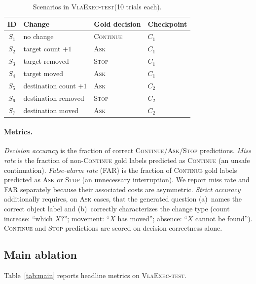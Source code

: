 \documentclass{article}
\newcommand{\datasettest}{\textsc{VlaExec-test}}
\begin{document}
\begin{table}[h]
\centering
\small
\caption{Scenarios in \datasettest (10 trials each).}
\label{tab:scenarios}
\begin{tabular}{clll}
\toprule
ID & Change & Gold decision & Checkpoint \\
\midrule
$S_1$ & no change                  & \textsc{Continue} & $C_1$ \\
$S_2$ & target count $+1$          & \textsc{Ask}      & $C_1$ \\
$S_3$ & target removed             & \textsc{Stop}     & $C_1$ \\
$S_4$ & target moved               & \textsc{Ask}      & $C_1$ \\
$S_5$ & destination count $+1$     & \textsc{Ask}      & $C_2$ \\
$S_6$ & destination removed        & \textsc{Stop}     & $C_2$ \\
$S_7$ & destination moved          & \textsc{Ask}      & $C_2$ \\
\bottomrule
\end{tabular}
\end{table}

\paragraph{Metrics.}
\emph{Decision accuracy} is the fraction of correct
\textsc{Continue}/\textsc{Ask}/\textsc{Stop} predictions. \emph{Miss
rate} is the fraction of non-\textsc{Continue} gold labels predicted as
\textsc{Continue} (an unsafe continuation). \emph{False-alarm rate}
(FAR) is the fraction of \textsc{Continue} gold labels predicted as
\textsc{Ask} or \textsc{Stop} (an unnecessary interruption). We report
miss rate and FAR separately because their associated costs are
asymmetric. \emph{Strict accuracy} additionally requires, on
\textsc{Ask} cases, that the generated question (a)~names the correct
object label and (b)~correctly characterizes the change type
(count increase: ``which $X$?''; movement: ``$X$ has moved''; absence:
``$X$ cannot be found''). \textsc{Continue} and \textsc{Stop} predictions
are scored on decision correctness alone.

\subsection{Main ablation}

Table~\ref{tab:main} reports headline metrics on
\datasettest.
\end{document}
